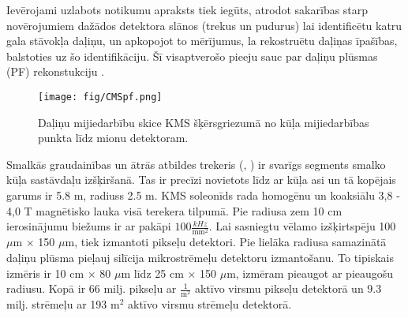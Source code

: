 Ievērojami uzlabots notikumu apraksts tiek iegūts, atrodot sakarības starp novērojumiem dažādos detektora slānos (trekus un pudurus) lai identificētu katru \gls{gala stāvokļa} daļiņu, un apkopojot to mērījumus, la rekostruētu daļiņas īpašības, balstoties uz šo identifikāciju. Šī visaptverošo pieeju sauc par \gls{daļiņu plūsmas} (PF) rekonstukciju \cite{Sirunyan:2017ulk}.

\begin{figure}[h]
  \centering
  \texttt{[image: fig/CMSpf.png]}
  \caption{Daļiņu mijiedarbību skice KMS šķērsgriezumā no kūļa mijiedarbības punkta līdz mionu detektoram.}
  \label{fig:CMSpf}
\end{figure}

Smalkās \gls{graudainības} un ātrās atbildes trekeris (\cite{Karimaki:368412}, \cite{tracker_addendum}) ir svarīgs segments smalko kūļa sastāvdaļu izšķiršanā. Tas ir precīzi novietots līdz ar kūļa asi un tā kopējais garums ir 5.8 m, radiuss 2.5 m. KMS soleonīds rada homogēnu un koaksiālu 3,8 - 4,0 T magnētisko lauka visā terekera tilpumā. Pie radiusa zem 10 cm ierosinājumu biežums ir ar pakāpi $100\frac{kHz}{\text{mm}^2}$. Lai sasniegtu vēlamo izšķirtspēju 100 $\mu$m $\times$ 150 $\mu$m, tiek izmantoti pikseļu detektori. Pie lielāka radiusa samazinātā daļiņu plūsma pieļauj silīcija mikrostrēmeļu detektoru izmantošanu. To tipiskais izmēris ir 10 cm $\times$ 80 $\mu$m līdz 25 cm $\times$ 150 $\mu$m, izmēram pieaugot ar pieaugošu radiusu. Kopā ir 66 milj. pikseļu ar $\frac{1}{\text{m}^2}$ aktīvo virsmu pikseļu detektorā un 9.3 milj. strēmeļu ar 193 m${}^2$ aktīvo virsmu strēmeļu detektorā.

